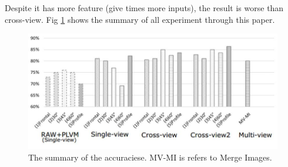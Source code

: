 Despite it has more feature (give times more inputs), the result is worse than cross-view.
Fig \ref{fig:summary} shows the summary of all experiment through this paper.
\begin{figure}[h]
	\centering
	\includegraphics[width=\columnwidth]{fig/summary.jpg}
	\caption{The summary of the accuraciese. MV-MI is refers to Merge Images.}
	\label{fig:summary}
\end{figure}
